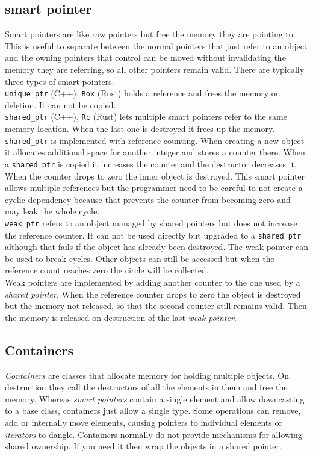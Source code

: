 \documentclass[conference,twocolumn]{IEEEtran}
\begin{document}
\subsection{smart pointer}
Smart pointers are like raw pointers but free the memory they are pointing to. This is useful to separate between the normal pointers that just refer to an object and the owning pointers that control can be moved without invalidating the memory they are referring, so all other pointers remain valid. There are typically three types of smart pointers.\\

\verb|unique_ptr| (C++), \verb|Box| (Rust) holds a reference and frees the memory on deletion. It can not be copied.
\\

\verb|shared_ptr| (C++), \verb|Rc| (Rust) lets multiple smart pointers refer to the same memory location. When the last one is destroyed it frees up the memory. \verb|shared_ptr| is implemented with reference counting. When creating a new object it allocates additional space for another integer and stores a counter there. When a \verb|shared_ptr| is copied it increases the counter and the destructor decreases it. When the counter drops to zero the inner object is destroyed. This smart pointer allows multiple references but the programmer need to be careful to not create a cyclic dependency because that prevents the counter from becoming zero and may leak the whole cycle. \\

\verb|weak_ptr| refers to an object managed by shared pointers but does not increase the reference counter. It can not be used directly but upgraded to a \verb|shared_ptr| although that fails if the object has already been destroyed. The weak pointer can be used to break cycles. Other objects can still be accessed but when the reference count reaches zero the circle will be collected. \\
Weak pointers are implemented by adding another counter to the one used by a \emph{shared pointer}. When the reference counter drops to zero the object is destroyed but the memory not released, so that the second counter still remains valid. Then the memory is released on destruction of the last \emph{weak pointer}.


\subsection{Containers}
\emph{Containers} are classes that allocate memory for holding multiple objects. On destruction they call the destructors of all the elements in them and free the memory. Whereas \emph{smart pointers} contain a single element and allow downcasting to a base class, containers just allow a single type. Some operations can remove, add or internally move elements, causing pointers to individual elements or \emph{iterators} to dangle.
Containers normally do not provide mechanisms for allowing shared ownership. If you need it then wrap the objects in a shared pointer.
\end{document}
